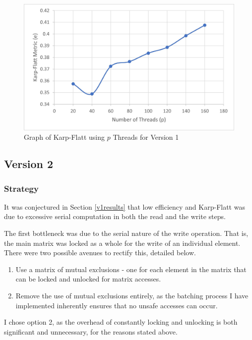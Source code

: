 \begin{figure}[H]
    \centering
    \includegraphics{kf1}
    \caption{Graph of Karp-Flatt using $p$ Threads for Version 1}
    \label{fig:kf1}
\end{figure}

\subsection{Version 2}

\subsubsection{Strategy}

It was conjectured in Section \ref{v1results} that low efficiency and Karp-Flatt was due to excessive serial computation in both the read and the write steps.

The first bottleneck was due to the serial nature of the write operation. That is, the main matrix was locked as a whole for the write of an individual element. There were two possible avenues to rectify this, detailed below.

\begin{enumerate}
    \item Use a matrix of mutual exclusions - one for each element in the matrix that can be locked and unlocked for matrix accesses.
    \item Remove the use of mutual exclusions entirely, as the batching process I have implemented inherently ensures that no unsafe accesses can occur. 
\end{enumerate}

\noindent I chose option 2, as the overhead of constantly locking and unlocking is both significant and unnecessary, for the reasons stated above.

